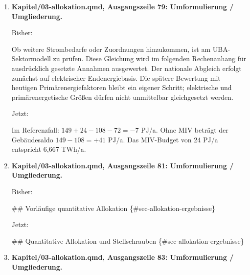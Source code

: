 \documentclass[
  ngerman,
  a4paper,
  DIV=11]{scrreprt}
\newenvironment{Shaded}{\begin{snugshade}}{\end{snugshade}}
\newcommand{\NormalTok}[1]{\textcolor[rgb]{0.00,0.23,0.31}{#1}}
\begin{document}
\begin{enumerate}
  Jetzt:

\begin{Shaded}
\begin{Highlighting}[]
\NormalTok{B\_\{\textbackslash{}mathrm\{Geb,Ziel\}\}=E\_\{\textbackslash{}mathrm\{PV,Geb\}\}+G\_\{\textbackslash{}mathrm\{MIV\}\}{-}E\_\{\textbackslash{}mathrm\{Geb\}\}{-}E\_\{\textbackslash{}mathrm\{MIV\}\}.}
\end{Highlighting}
\end{Shaded}
\item
  \textbf{Kapitel/03-allokation.qmd, Ausgangszeile 79: Umformulierung /
  Umgliederung.}

  Bisher:

\begin{Shaded}
\begin{Highlighting}[]
\NormalTok{Ob weitere Strombedarfe oder Zuordnungen hinzukommen, ist am UBA{-}Sektormodell zu prüfen. Diese Gleichung wird im folgenden Rechenanhang für ausdrücklich gesetzte Annahmen ausgewertet. Der nationale Abgleich erfolgt zunächst auf elektrischer Endenergiebasis. Die spätere Bewertung mit heutigen Primärenergiefaktoren bleibt ein eigener Schritt; elektrische und primärenergetische Größen dürfen nicht unmittelbar gleichgesetzt werden.}
\end{Highlighting}
\end{Shaded}

  Jetzt:

\begin{Shaded}
\begin{Highlighting}[]
\NormalTok{Im Referenzfall: $149+24{-}108{-}72={-}7$ PJ/a. Ohne MIV beträgt der Gebäudesaldo $149{-}108=+41$ PJ/a. Das MIV{-}Budget von 24 PJ/a entspricht 6,667 TWh/a.}
\end{Highlighting}
\end{Shaded}
\item
  \textbf{Kapitel/03-allokation.qmd, Ausgangszeile 81: Umformulierung /
  Umgliederung.}

  Bisher:

\begin{Shaded}
\begin{Highlighting}[]
\NormalTok{\#\# Vorläufige quantitative Allokation \{\#sec{-}allokation{-}ergebnisse\}}
\end{Highlighting}
\end{Shaded}

  Jetzt:

\begin{Shaded}
\begin{Highlighting}[]
\NormalTok{\#\# Quantitative Allokation und Stellschrauben \{\#sec{-}allokation{-}ergebnisse\}}
\end{Highlighting}
\end{Shaded}
\item
  \textbf{Kapitel/03-allokation.qmd, Ausgangszeile 83: Umformulierung /
  Umgliederung.}


\end{enumerate}
\end{document}
